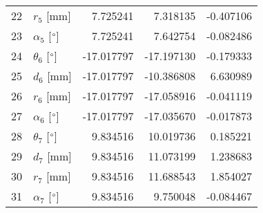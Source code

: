 \documentclass{standalone}%
\begin{document}
\begin{tabular}{llrrr}
22 &              $r_{5}$ [mm] &   7.725241 &   7.318135 &  -0.407106 \\
23 &  $\alpha_{5}$ [$\degree$] &   7.725241 &   7.642754 &  -0.082486 \\
24 &  $\theta_{6}$ [$\degree$] & -17.017797 & -17.197130 &  -0.179333 \\
25 &              $d_{6}$ [mm] & -17.017797 & -10.386808 &   6.630989 \\
26 &              $r_{6}$ [mm] & -17.017797 & -17.058916 &  -0.041119 \\
27 &  $\alpha_{6}$ [$\degree$] & -17.017797 & -17.035670 &  -0.017873 \\
28 &  $\theta_{7}$ [$\degree$] &   9.834516 &  10.019736 &   0.185221 \\
29 &              $d_{7}$ [mm] &   9.834516 &  11.073199 &   1.238683 \\
30 &              $r_{7}$ [mm] &   9.834516 &  11.688543 &   1.854027 \\
31 &  $\alpha_{7}$ [$\degree$] &   9.834516 &   9.750048 &  -0.084467 \\
\bottomrule
\end{tabular}
%
\end{document}
